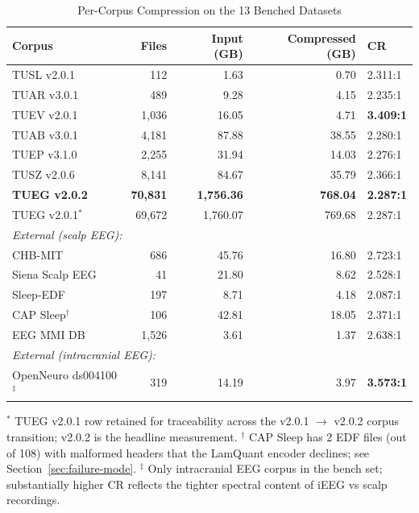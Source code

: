 \documentclass[journal]{IEEEtran}
\begin{document}
\begin{table}[!t]
\renewcommand{\arraystretch}{1.3}
\caption{Per-Corpus Compression on the 13 Benched Datasets}
\label{tab:per-corpus}
\centering
\begin{tabular}{lrrrl}
\toprule
Corpus & Files & Input (GB) & Compressed (GB) & CR \\
\midrule
TUSL v2.0.1 &   112 &    1.63 &   0.70 & 2.311:1 \\
TUAR v3.0.1 &   489 &    9.28 &   4.15 & 2.235:1 \\
TUEV v2.0.1 & 1{,}036 &  16.05 &   4.71 & \textbf{3.409:1} \\
TUAB v3.0.1 & 4{,}181 &  87.88 &  38.55 & 2.280:1 \\
TUEP v3.1.0 & 2{,}255 &  31.94 &  14.03 & 2.276:1 \\
TUSZ v2.0.6 & 8{,}141 &  84.67 &  35.79 & 2.366:1 \\
\textbf{TUEG v2.0.2}    & \textbf{70{,}831} & \textbf{1{,}756.36} & \textbf{768.04} & \textbf{2.287:1} \\
TUEG v2.0.1$^\ast$ & 69{,}672 & 1{,}760.07 & 769.68 & 2.287:1 \\
\midrule
\multicolumn{5}{l}{\textit{External (scalp EEG):}} \\
CHB-MIT             &    686  & 45.76 & 16.80 & 2.723:1 \\
Siena Scalp EEG     &     41  & 21.80 &  8.62 & 2.528:1 \\
Sleep-EDF           &    197  &  8.71 &  4.18 & 2.087:1 \\
CAP Sleep$^\dagger$ &    106  & 42.81 & 18.05 & 2.371:1 \\
EEG MMI DB          &  1{,}526 &  3.61 &  1.37 & 2.638:1 \\
\midrule
\multicolumn{5}{l}{\textit{External (intracranial EEG):}} \\
OpenNeuro ds004100$^\ddagger$ & 319 & 14.19 & 3.97 & \textbf{3.573:1} \\
\bottomrule
\end{tabular}

\vspace{0.4em}
\noindent\footnotesize
$^\ast$ TUEG v2.0.1 row retained for traceability across the
v2.0.1 $\rightarrow$ v2.0.2 corpus transition; v2.0.2 is the
headline measurement.
\hfill\break
$^\dagger$ CAP Sleep has 2 EDF files (out of 108) with malformed
headers that the LamQuant encoder declines; see
Section~\ref{sec:failure-mode}.
\hfill\break
$^\ddagger$ Only intracranial EEG corpus in the bench set;
substantially higher CR reflects the tighter spectral content
of iEEG vs scalp recordings.

\end{table}
\end{document}
